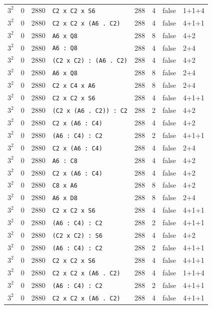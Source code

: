 \begin{longtable}{llrlrrll}
$3^2$ & 0 & 2880 & \texttt{C2 x C2 x S6} & 288 & 4 & false & 1+1+4\\
$3^2$ & 0 & 2880 & \texttt{C2 x C2 x (A6 . C2)} & 288 & 4 & false & 4+1+1\\
$3^2$ & 0 & 2880 & \texttt{A6 x Q8} & 288 & 8 & false & 4+2\\
$3^2$ & 0 & 2880 & \texttt{A6 : Q8} & 288 & 4 & false & 2+4\\
$3^2$ & 0 & 2880 & \texttt{(C2 x C2) : (A6 . C2)} & 288 & 4 & false & 4+2\\
$3^2$ & 0 & 2880 & \texttt{A6 x Q8} & 288 & 8 & false & 2+4\\
$3^2$ & 0 & 2880 & \texttt{C2 x C4 x A6} & 288 & 8 & false & 2+4\\
$3^2$ & 0 & 2880 & \texttt{C2 x C2 x S6} & 288 & 4 & false & 4+1+1\\
$3^2$ & 0 & 2880 & \texttt{(C2 x (A6 . C2)) : C2} & 288 & 2 & false & 4+2\\
$3^2$ & 0 & 2880 & \texttt{C2 x (A6 : C4)} & 288 & 4 & false & 4+2\\
$3^2$ & 0 & 2880 & \texttt{(A6 : C4) : C2} & 288 & 2 & false & 4+1+1\\
$3^2$ & 0 & 2880 & \texttt{C2 x (A6 : C4)} & 288 & 4 & false & 2+4\\
$3^2$ & 0 & 2880 & \texttt{A6 : C8} & 288 & 4 & false & 4+2\\
$3^2$ & 0 & 2880 & \texttt{C2 x (A6 : C4)} & 288 & 4 & false & 4+2\\
$3^2$ & 0 & 2880 & \texttt{C8 x A6} & 288 & 8 & false & 4+2\\
$3^2$ & 0 & 2880 & \texttt{A6 x D8} & 288 & 8 & false & 2+4\\
$3^2$ & 0 & 2880 & \texttt{C2 x C2 x S6} & 288 & 4 & false & 4+1+1\\
$3^2$ & 0 & 2880 & \texttt{(A6 : C4) : C2} & 288 & 2 & false & 4+1+1\\
$3^2$ & 0 & 2880 & \texttt{(C2 x C2) : S6} & 288 & 4 & false & 4+2\\
$3^2$ & 0 & 2880 & \texttt{(A6 : C4) : C2} & 288 & 2 & false & 4+1+1\\
$3^2$ & 0 & 2880 & \texttt{C2 x C2 x S6} & 288 & 4 & false & 4+1+1\\
$3^2$ & 0 & 2880 & \texttt{C2 x C2 x (A6 . C2)} & 288 & 4 & false & 1+1+4\\
$3^2$ & 0 & 2880 & \texttt{(A6 : C4) : C2} & 288 & 2 & false & 4+1+1\\
$3^2$ & 0 & 2880 & \texttt{C2 x C2 x (A6 . C2)} & 288 & 4 & false & 4+1+1\\

\end{longtable}
